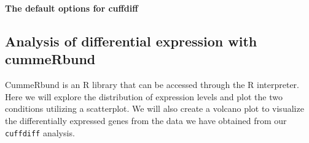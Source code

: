 \documentclass[a4paper,10pt]{article}
\begin{document}
\setlength\fboxsep{0pt}\vspace{1em}
\textbf{The default options for cuffdiff}\\
\setlength\fboxsep{0pt}\vspace{1em}

\subsection{Analysis of differential expression with cummeRbund}
CummeRbund is an R library that can be accessed through the R interpreter.  Here we will explore the distribution of expression levels and plot the two conditions utilizing a scatterplot.  We will also create a volcano plot to visualize the differentially expressed genes from the data we have obtained from our \texttt{\footnotesize{cuffdiff}} analysis.\vspace{1em}\\
\end{document}
